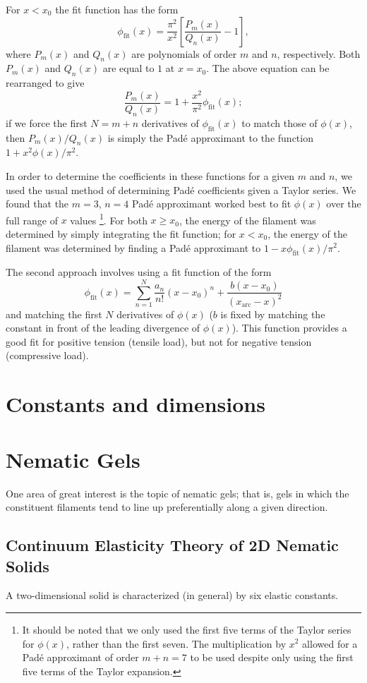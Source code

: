 \documentclass[pre,floatfix,twocolumn]{revtex4}
\begin{document}
For $x<x_0$ the fit function has the form
\[
\phi_{\text{fit}}(x) = \frac{\pi^2}{x^2}\left[\frac{P_{m}(x)}{Q_{n}(x)}-1\right],
\]
where $P_{m}(x)$ and $Q_{n}(x)$ are polynomials of order $m$ and $n$, respectively.  Both $P_{m}(x)$ and $Q_{n}(x)$ are equal to $1$ at $x=x_0$.  The above equation can be rearranged to give
\[
\frac{P_{m}(x)}{Q_{n}(x)} = 1 + \frac{x^2}{\pi^2}\phi_{\text{fit}}(x);
\]
if we force the first $N=m+n$ derivatives of $\phi_{\text{fit}}(x)$ to match those of $\phi(x)$, then $P_{m}(x)/Q_{n}(x)$ is simply the Pad\'{e} approximant to the function $1 + x^2\phi(x)/\pi^2$.

In order to determine the coefficients in these functions for a given $m$ and $n$, we used the usual method of determining Pad\'{e} coefficients given a Taylor series.  We found that the $m=3$, $n=4$ Pad\'{e} approximant worked best to fit $\phi(x)$ over the full range of $x$ values \footnote{It should be noted that we only used the first five terms of the Taylor series for $\phi(x)$, rather than the first seven.  The multiplication by $x^2$ allowed for a Pad\'{e} approximant of order $m+n=7$ to be used despite only using the first five terms of the Taylor expansion.}.  For both $x\ge x_0$, the energy of the filament was determined by simply integrating the fit function; for $x<x_0$, the energy of the filament was determined by finding a Pad\'{e} approximant to $1-x\phi_{\text{fit}}(x)/\pi^2$.

The second approach involves using a fit function of the form
\[
\phi_{\text{fit}}(x) = \sum_{n=1}^{N}\frac{a_{n}}{n!}(x-x_0)^n + \frac{b(x-x_0)}{(x_{\text{arc}}-x)^2}
\]
and matching the first $N$ derivatives of $\phi(x)$ ($b$ is fixed by matching the constant in front of the leading divergence of $\phi(x)$).  This function provides a good fit for positive tension (tensile load), but not for negative tension (compressive load).
\section{Constants and dimensions}

\section{Nematic Gels}
One area of great interest is the topic of nematic gels; that is, gels in which the constituent filaments tend to line up preferentially along a given direction.

\subsection{Continuum Elasticity Theory of 2D Nematic Solids}
A two-dimensional solid is characterized (in general) by six elastic constants.  
\end{document}
